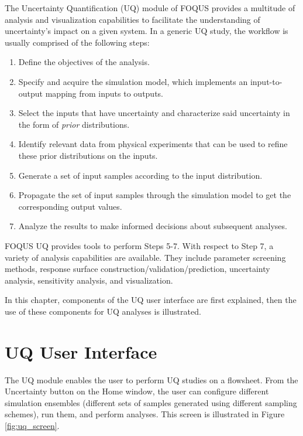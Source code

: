 \label{sec:uq_overview}

The Uncertainty Quantification (UQ) module of FOQUS provides a multitude of analysis and visualization
capabilities to facilitate the understanding of uncertainty's impact on a
given system. In a generic UQ study, the workflow is usually comprised of the following
steps:

\begin{enumerate}
	\item Define the objectives of the analysis.
	\item Specify and acquire the simulation model, which implements an
     input-to-output mapping from inputs to outputs.
	\item Select the inputs that have uncertainty and characterize said
     uncertainty in the form of \emph{prior} distributions.
	\item Identify relevant data from physical experiments that can be used
     to refine these prior distributions on the inputs.
	\item Generate a set of input samples according to the input
     distribution.
	\item Propagate the set of input samples through the simulation model to 
     get the corresponding output values.
	\item Analyze the results to make informed decisions about subsequent analyses.
\end{enumerate}
FOQUS UQ provides tools to perform Steps 5-7. With respect to Step 7, a
variety of analysis capabilities are available. They include parameter
screening methods, response surface construction/validation/prediction,
uncertainty analysis, sensitivity analysis, and visualization.

In this chapter, components of the UQ user interface are first explained,
then the use of these components for UQ analyses is illustrated.

\section{UQ User Interface}

The UQ module enables the user to perform UQ studies on a flowsheet. 
From the Uncertainty button on the Home window, the user can configure different simulation ensembles
(different sets of samples generated using different sampling schemes), run
them, and perform analyses. This screen is illustrated in Figure
\ref{fig:uq_screen}.

